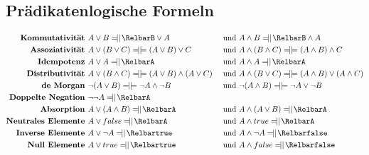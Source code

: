 \documentclass{article}
\DeclareRobustCommand*{\tautequiv}{%
  \Relbar\joinrel\mathrel{|}
  \mathrel{|}\joinrel\Relbar%
}
\begin{document}
		\subsection{Pr\"adikatenlogische Formeln}
			\begin{align*}
				\textbf{Kommutativit\"at } & A \vee B \tautequiv B \vee A &  \text{ und } & A \wedge B \tautequiv B \wedge A\\
				\textbf{Assoziativit\"at } & A \vee (B \vee C) \tautequiv (A \vee B) \vee C & \text{ und } & A \wedge (B \wedge C) \tautequiv (A \wedge B) \wedge C\\
				\textbf{Idempotenz } & A \vee A \tautequiv A & \text{ und } & A \wedge A \tautequiv A\\
				\textbf{Distributivit\"at } & A \vee (B \wedge C) \tautequiv (A \vee B) \wedge (A \vee C)&  \text{ und } & A \wedge (B \vee C) \tautequiv (A \wedge B) \vee (A \wedge C)\\
				\textbf{de Morgan } & \neg (A \vee B) \tautequiv \neg A \wedge \neg B & \text{ und } & \neg (A \wedge B) \tautequiv \neg A \vee \neg B\\
				\textbf{Doppelte Negation } & \neg \neg A \tautequiv A\\
				\textbf{Absorption } & A \vee (A \wedge B) \tautequiv A & \text{ und } & A \wedge (A \vee B) \tautequiv A\\
				\textbf{Neutrales Elemente } & A \vee false \tautequiv A & \text{ und } & A \wedge true \tautequiv A\\
				\textbf{Inverse Elemente } & A \vee \neg A \tautequiv true & \text{ und } & A \wedge \neg A \tautequiv false\\
				\textbf{Null Elemente } & A \vee true \tautequiv true & \text{ und } & A \wedge false \tautequiv false
			\end{align*}
\end{document}
